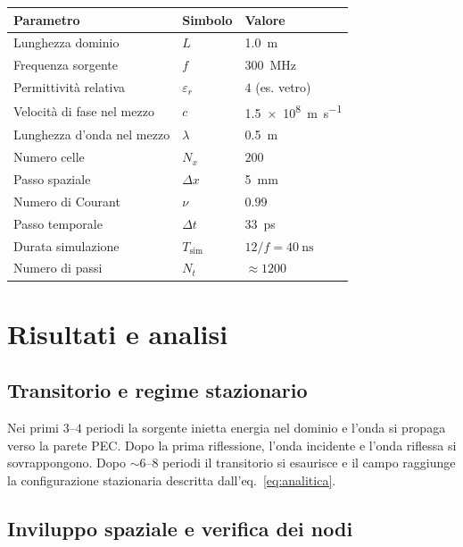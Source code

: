 \documentclass[a4paper, 11pt]{article}
\newcommand{\eps}{\varepsilon}
\newcommand{\dx}{\Delta x}
\newcommand{\dt}{\Delta t}
\begin{document}
\begin{center}
\begin{tabular}{lll}
\toprule
Parametro & Simbolo & Valore \\
\midrule
Lunghezza dominio & $L$ & \SI{1.0}{\metre} \\
Frequenza sorgente & $f$ & \SI{300}{\mega\hertz} \\
Permittività relativa & $\eps_r$ & $4$ (es. vetro) \\
Velocità di fase nel mezzo & $c$ & \SI{1.5e8}{\metre\per\second} \\
Lunghezza d'onda nel mezzo & $\lambda$ & \SI{0.5}{\metre} \\
Numero celle & $N_x$ & $200$ \\
Passo spaziale & $\dx$ & \SI{5}{\milli\metre} \\
Numero di Courant & $\nu$ & $0.99$ \\
Passo temporale & $\dt$ & \SI{33}{\pico\second} \\
Durata simulazione & $T_{\text{sim}}$ & $12/f = \SI{40}{\nano\second}$ \\
Numero di passi & $N_t$ & $\approx 1200$ \\
\bottomrule
\end{tabular}
\end{center}

\section{Risultati e analisi}

\subsection{Transitorio e regime stazionario}

Nei primi $3$--$4$ periodi la sorgente inietta energia nel dominio e
l'onda si propaga verso la parete PEC. Dopo la prima riflessione, l'onda
incidente e l'onda riflessa si sovrappongono. Dopo $\sim 6$--$8$ periodi
il transitorio si esaurisce e il campo raggiunge la configurazione
stazionaria descritta dall'eq.~\eqref{eq:analitica}.

\subsection{Inviluppo spaziale e verifica dei nodi}
\end{document}
